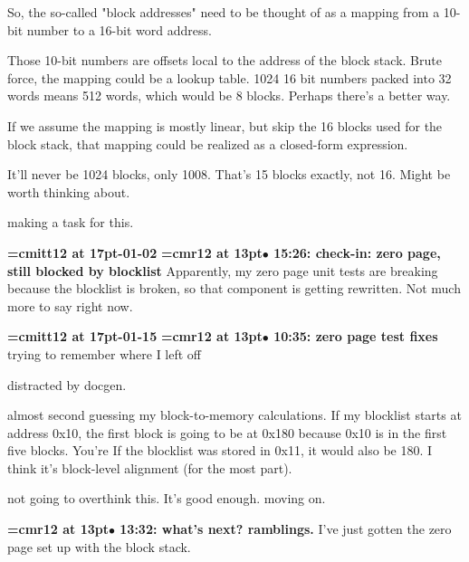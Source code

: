 So, the so-called "block addresses" need to be thought of as a mapping from a 10-bit number to a 16-bit word address.
\par

Those 10-bit numbers are offsets local to the address of the block stack. Brute force, the mapping could be a lookup table. 1024 16 bit numbers packed into 32 words means 512 words, which would be 8 blocks. Perhaps there's a better way.
\par

If we assume the mapping is mostly linear, but skip the 16 blocks used for the block stack, that mapping could be realized as a closed-form expression.
\par

It'll never be 1024 blocks, only 1008. That's 15 blocks exactly, not 16. Might be worth thinking about.
\par

making a task for this.
\par

{\medskip\noindent\bf\font\titlefont=cmitt12 at 17pt-01-02}\medskip
{\smallskip\noindent\bf\font\titlefont=cmr12 at 13pt\titlefont $\bullet$ 15:26: check-in: zero page, still blocked by blocklist}\smallskip
Apparently, my zero page unit tests are breaking because the blocklist is broken, so that component is getting rewritten. Not much more to say right now.
\par

{\medskip\noindent\bf\font\titlefont=cmitt12 at 17pt-01-15}\medskip
{\smallskip\noindent\bf\font\titlefont=cmr12 at 13pt\titlefont $\bullet$ 10:35: zero page test fixes}\smallskip
trying to remember where I left off
\par

distracted by docgen.
\par

almost second guessing my block-to-memory calculations. If my blocklist starts at address 0x10, the first block is going to be at 0x180 because 0x10 is in the first five blocks. You're If the blocklist was stored in 0x11, it would also be 180. I think it's block-level alignment (for the most part).
\par

not going to overthink this. It's good enough. moving on.
\par

{\smallskip\noindent\bf\font\titlefont=cmr12 at 13pt\titlefont $\bullet$ 13:32: what's next? ramblings.}\smallskip
I've just gotten the zero page set up with the block stack.
\par

